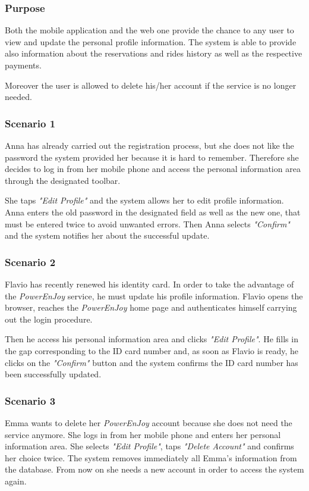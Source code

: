 \subsubsection{Purpose}
Both the mobile application and the web one provide the chance to any user to view and update the personal profile information. The system is able to provide also information about the reservations and rides history as well as the respective payments.

Moreover the user is allowed to delete his/her account if the service is no longer needed.

\subsubsection{Scenario 1}
Anna has already carried out the registration process, but she does not like the password the system provided her because it is hard to remember. Therefore she decides to log in from her mobile phone and access the personal information area through the designated toolbar.

She taps \emph{"Edit Profile"} and the system allows her to edit profile information. Anna enters the old password in the designated field as well as the new one, that must be entered twice to avoid unwanted errors. Then Anna selects \emph{"Confirm"} and the system notifies her about the successful update.

\subsubsection{Scenario 2}
Flavio has recently renewed his identity card. In order to take the advantage of the \emph{PowerEnJoy} service, he must update his profile information. Flavio opens the browser, reaches the \emph{PowerEnJoy} home page and authenticates himself carrying out the login procedure. 

Then he access his personal information area and clicks \emph{"Edit Profile"}. He fills in the gap corresponding to the ID card number and, as soon as Flavio is ready, he clicks on the \emph{"Confirm"} button and the system confirms the ID card number has been successfully updated.

\subsubsection{Scenario 3}
Emma wants to delete her \emph{PowerEnJoy} account because she does not need the service anymore. She logs in from her mobile phone and enters her personal information area. She selects \emph{"Edit Profile"}, taps \emph{"Delete Account"} and confirms her choice twice. The system removes immediately all Emma's information from the database. From now on she needs a new account in order to access the system again.

